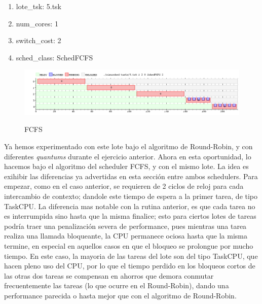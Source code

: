 \begin{enumerate}
	\item lote\_tsk: 5.tsk
	\item num\_cores: 1
	\item switch\_cost: 2
	\item sched\_class: SchedFCFS
\end{enumerate}

\begin{figure}[h]
    \includegraphics[width=\linewidth]{images/6_quantum2.png}
    \label{fig:Task Consola}
    \caption{FCFS}
\end{figure}

Ya hemos experimentado con este lote bajo el algoritmo de Round-Robin, y con diferentes \textit{quantums} durante el ejercicio anterior. Ahora en esta oportunidad, lo hacemos bajo el algoritmo del scheduler FCFS, y con el mismo lote. La idea es exihibir las diferencias ya advertidas en esta sección entre ambos schedulers. Para empezar, como en el caso anterior, se requieren de 2 ciclos de reloj para cada intercambio de contexto; dandole este tiempo de espera a la primer tarea, de tipo TaskCPU. La diferencia mas notable con la rutina anterior, es que cada tarea no es interrumpida sino hasta que la misma finalice; esto para ciertos lotes de tareas podría traer una penalización severa de performance, pues mientras una tarea realiza una llamada bloqueante, la CPU permanece ociosa hasta que la misma termine, en especial en aquellos casos en que el bloqueo se prolongue por mucho tiempo. En este caso, la mayoria de las tareas del lote son del tipo TaskCPU, que hacen pleno uso del CPU, por lo que el tiempo perdido en los bloqueos cortos de las otras dos tareas se compensan en ahorros que demora conmutar frecuentemente las tareas (lo que ocurre en el Round-Robin), dando una performance parecida o hasta mejor que con el algoritmo de Round-Robin.